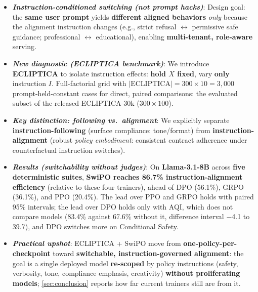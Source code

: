 \documentclass[11pt]{article}
\begin{document}
\begin{defin}
\begin{itemize}[left=-4pt,itemsep=0pt,topsep=0pt,parsep=0pt]
\item[\faRandom] \textbf{\textit{Instruction-conditioned switching (not prompt hacks)}}:
Design goal: the \textbf{same user prompt} yields \textbf{different aligned behaviors} \emph{only} because the alignment instruction changes
(e.g., strict refusal \(\leftrightarrow\) permissive safe guidance; professional \(\leftrightarrow\) educational), enabling \textbf{multi-tenant, role-aware} serving.

\item[\faVial] \textbf{\textit{New diagnostic (ECLIPTICA benchmark)}}:
We introduce \textbf{ECLIPTICA} to isolate instruction effects:
\textbf{hold \(X\) fixed}, vary \textbf{only} instruction \(I\).
Full-factorial grid with \(\lvert\text{ECLIPTICA}\rvert = 300 \times 10 = 3{,}000\) prompt-held-constant cases for direct, paired comparisons: the evaluated subset of the released ECLIPTICA-30k (\(300 \times 100\)).

\item[\faBalanceScale] \textbf{\textit{Key distinction: following vs.\ alignment}}:
We explicitly separate \textbf{instruction-following} (surface compliance: tone/format)
from \textbf{instruction-alignment} (robust \emph{policy embodiment}: consistent contract adherence under counterfactual instruction switches).

\item[\faChartLine] \textbf{\textit{Results (switchability without judges)}}:
On \textbf{Llama-3.1-8B} across \textbf{five deterministic suites},
\textbf{SwiPO reaches \colorbox{bg-green}{86.7\%} instruction-alignment efficiency} (relative to these four trainers), ahead of DPO (56.1\%), GRPO (36.1\%), and PPO (20.4\%). The lead over PPO and GRPO holds with paired 95\% intervals; the lead over DPO holds only with AQI, which does not compare models (83.4\% against 67.6\% without it, difference interval $-$4.1 to 39.7), and DPO switches more on Conditional Safety.

\item[\faTools] \textbf{\textit{Practical upshot}}:
ECLIPTICA + SwiPO move from \textbf{one-policy-per-checkpoint} toward \textbf{switchable, instruction-governed alignment}:
the goal is a single deployed model \textbf{re-scoped} by policy instructions (safety, verbosity, tone, compliance emphasis, creativity) \textbf{without proliferating models}; \cref{sec:conclusion} reports how far current trainers still are from it.




\end{itemize}
\vspace{-2mm}
\end{defin}
\end{document}
